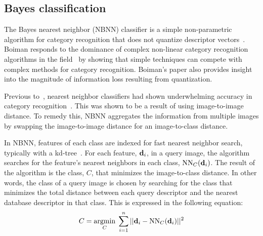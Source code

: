 


    \subsection{\Naive{} Bayes classification}\label{sec:nbnn}  

        The \Naive{} Bayes nearest neighbor (NBNN) classifier is a simple non-parametric algorithm for category
          recognition that does not quantize descriptor vectors~\cite{boiman_defense_2008}.
        Boiman responds to the dominance of complex non-linear category recognition algorithms in the
          field~\cite{varma_learning_2007, marszalek_learning_2007} by showing that simple techniques can compete
          with complex methods for category recognition.
        Boiman's paper also provides insight into the magnitude of information loss resulting from quantization.
          
        Previous to~\cite{boiman_defense_2008}, nearest neighbor classifiers had shown underwhelming accuracy in
          category recognition~\cite{varma_unifying_2004, lazebnik_beyond_2006, marszalek_learning_2007}.
        This was shown to be a result of using image-to-image distance.
        To remedy this, NBNN aggregates the information from multiple images by swapping the image-to-image
          distance for an image-to-class distance.

        In NBNN, features of each class are indexed for fast nearest neighbor search, typically with a
          kd-tree~\cite{bentley_multidimensional_1975}.
        For each feature, $\mathbf{d}_i$, in a query image, the algorithm searches for the feature's nearest neighbors
          in each class, $\operatorname{NN}_C(\mathbf{d}_i)$.
        The result of the algorithm is the class, $C$, that minimizes the image-to-class distance.
        In other words, the class of a query image is chosen by searching for the class that minimizes the total
          distance between each query descriptor and the nearest database descriptor in that class.
        This is expressed in the following equation:
        \begin{equation}
            C = \underset{C}{\operatorname{argmin}}\; \sum_{i=1}^n ||\mathbf{d}_i - \operatorname{NN}_C(\mathbf{d}_i)||^2
        \end{equation}

